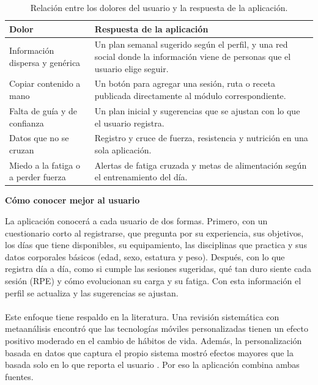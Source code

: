 \begin{table}[h!]
    \centering
    \renewcommand{\arraystretch}{1.4}
    \begin{tabular}{|>{\raggedright\arraybackslash}m{5cm}|>{\raggedright\arraybackslash}m{10cm}|}
        \hline
        \rowcolor[HTML]{EFEFEF}
        \textbf{Dolor} & \textbf{Respuesta de la aplicación} \\ \hline
        Información dispersa y genérica & Un plan semanal sugerido según el perfil, y una red social donde la información viene de personas que el usuario elige seguir. \\ \hline
        Copiar contenido a mano & Un botón para agregar una sesión, ruta o receta publicada directamente al módulo correspondiente. \\ \hline
        Falta de guía y de confianza & Un plan inicial y sugerencias que se ajustan con lo que el usuario registra. \\ \hline
        Datos que no se cruzan & Registro y cruce de fuerza, resistencia y nutrición en una sola aplicación. \\ \hline
        Miedo a la fatiga o a perder fuerza & Alertas de fatiga cruzada y metas de alimentación según el entrenamiento del día. \\ \hline
    \end{tabular}
    \caption{Relación entre los dolores del usuario y la respuesta de la aplicación.}
    \label{tab:dolores_respuesta}
\end{table}

\textbf{Cómo conocer mejor al usuario}

La aplicación conocerá a cada usuario de dos formas. Primero, con un cuestionario corto al registrarse, que pregunta por su experiencia, sus objetivos, los días que tiene disponibles, su equipamiento, las disciplinas que practica y sus datos corporales básicos (edad, sexo, estatura y peso). Después, con lo que registra día a día, como si cumple las sesiones sugeridas, qué tan duro siente cada sesión (RPE) y cómo evolucionan su carga y su fatiga. Con esta información el perfil se actualiza y las sugerencias se ajustan.
\\\\
Este enfoque tiene respaldo en la literatura. Una revisión sistemática con metaanálisis encontró que las tecnologías móviles personalizadas tienen un efecto positivo moderado en el cambio de hábitos de vida. Además, la personalización basada en datos que captura el propio sistema mostró efectos mayores que la basada solo en lo que reporta el usuario \citep{tong2021personalized}. Por eso la aplicación combina ambas fuentes.
